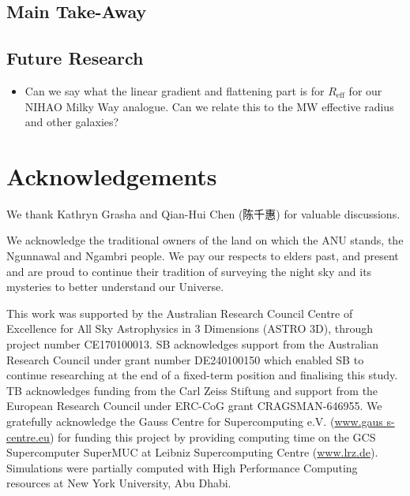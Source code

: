 \documentclass[fleqn,usenatbib]{mnras}
\begin{document}
\subsection{Main Take-Away}

\subsection{Future Research}

\begin{itemize}
    \item Can we say what the linear gradient and flattening part is for $R_\text{eff}$ for our NIHAO Milky Way analogue. Can we relate this to the MW effective radius and other galaxies?
\end{itemize}

\section*{Acknowledgements}

\begin{CJK}{UTF8}{gbsn}
We thank Kathryn Grasha and Qian-Hui Chen (陈千惠) for valuable discussions.
\end{CJK}

We acknowledge the traditional owners of the land on which the ANU stands, the Ngunnawal and Ngambri people. We pay our respects to elders past, and present and are proud to continue their tradition of surveying the night sky and its mysteries to better understand our Universe.

This work was supported by the Australian Research Council Centre of Excellence for All Sky Astrophysics in 3 Dimensions (ASTRO 3D), through project number CE170100013. SB acknowledges support from the Australian Research Council under grant number DE240100150 which enabled SB to continue researching at the end of a fixed-term position and finalising this study. TB acknowledges funding from the Carl Zeiss Stiftung and support from the European Research Council under ERC-CoG grant CRAGSMAN-646955. We gratefully acknowledge the Gauss Centre for Supercomputing e.V. (\url{www.gaus s-centre.eu}) for funding this project by providing computing time on the GCS Supercomputer SuperMUC at Leibniz Supercomputing Centre (\url{www.lrz.de}). Simulations were partially computed with High Performance Computing resources at New York University, Abu Dhabi.
\end{document}
